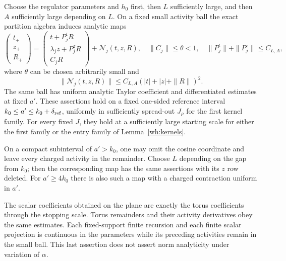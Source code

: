 \begin{proposition}\label{wh:map}
Choose the regulator parameters and $h_0$ first, then $L$ sufficiently
large, and then $A$ sufficiently large depending on $L$.  On a fixed
small activity ball the exact partition algebra induces analytic maps
\begin{equation}\label{wh:triangular}
 \begin{pmatrix}t_+\\z_+\\R_+\end{pmatrix}
 =\begin{pmatrix}t+P_j^tR\\\lambda_jz+P_j^zR\\C_jR\end{pmatrix}
     +\mathcal N_j(t,z,R),
 \quad
 \|C_j\|\le\theta<1,\quad
 \|P_j^t\|+\|P_j^z\|\le C_{L,A},
\end{equation}
where $\theta$ can be chosen arbitrarily small and
\begin{equation}\label{wh:nonlinear}
 \|\mathcal N_j(t,z,R)\|
       \le C_{L,A}(|t|+|z|+\|R\|)^2.
\end{equation}
The same ball has uniform analytic Taylor coefficient and differentiated
estimates at fixed $a'$.  These assertions hold on a fixed one-sided
reference interval $k_0\le a'\le k_0+\delta_{\rm ref}$,
uniformly in sufficiently spread-out $J_\rho$ for the first kernel
family.  For every fixed $J$, they hold at a sufficiently large
starting scale for either the first family or the entry family of
Lemma~\ref{wh:kernels}.

On a compact subinterval of $a'>k_0$, one may omit the cosine
coordinate and leave every charged activity in the remainder.  Choose
$L$ depending on the gap from $k_0$; then the corresponding map has
the same assertions with its $z$ row deleted.  For $a'\ge4k_0$ there
is also such a map with a charged contraction uniform in $a'$.

The scalar coefficients obtained on the plane are exactly the torus
coefficients through the stopping scale.  Torus remainders and their
activity derivatives obey the same estimates.  Each fixed-support
finite recursion and each finite scalar projection is continuous in
the parameters while its preceding activities remain in the small
ball.  This last assertion does not assert norm analyticity under
variation of $\alpha$.
\end{proposition}

